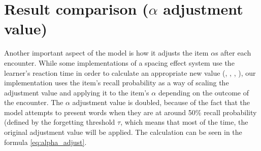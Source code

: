 \documentclass[a4paper]{report}
\begin{document}
\begin{table}[h]
	\centering\small
	\caption{Encounter Duration Test Results}
	\label{tab:enc_dur}
\end{table}


\section{Result comparison ($\alpha$ adjustment value)}
Another important aspect of the model is how it adjusts the item $\alpha$s after each encounter. While some implementations of a spacing effect system use the learner's reaction time in order to calculate an appropriate new value (\cite{vans09}, \cite{koelewijn10}, \cite{nijboer11}, \cite{thiel10}), our implementation uses the item's recall probability as a way of scaling the adjustment value and applying it to the item's $\alpha$ depending on the outcome of the encounter. The $\alpha$ adjustment value is doubled, because of the fact that the model attempts to present words when they are at around 50\% recall probability (defined by the forgetting threshold $\tau$, which means that most of the time, the original adjustment value will be applied. The calculation can be seen in the formula \ref{eq:alpha_adjust}.
    
\end{document}

